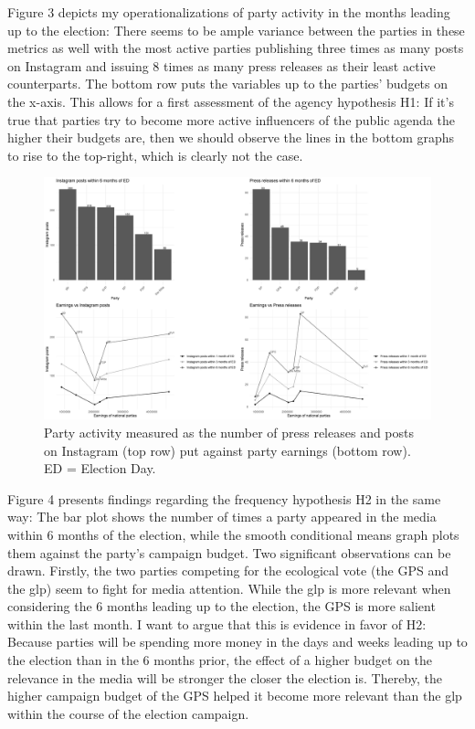 \documentclass[11pt,a4paper]{article}
\begin{document}
Figure 3 depicts my operationalizations of party activity in the months leading up to the election: There seems to be ample variance between the parties in these metrics as well with the most active parties publishing three times as many posts on Instagram and issuing 8 times as many press releases as their least active counterparts. The bottom row puts the variables up to the parties’ budgets on the x-axis. This allows for a first assessment of the agency hypothesis H1: If it’s true that parties try to become more active influencers of the public agenda the higher their budgets are, then we should observe the lines in the bottom graphs to rise to the top-right, which is clearly not the case.
\begin{figure}
    \centering
    \includegraphics[width=1\linewidth]{output/plots/plot_figure_3.png}
    \caption{Party activity measured as the number of press releases and posts on Instagram (top row) put against party earnings (bottom row). ED = Election Day.}
    \label{fig:enter-label}
\end{figure}
Figure 4 presents findings regarding the frequency hypothesis H2 in the same way: The bar plot shows the number of times a party appeared in the media within 6 months of the election, while the smooth conditional means graph plots them against the party’s campaign budget. Two significant observations can be drawn. Firstly, the two parties competing for the ecological vote (the GPS and the glp) seem to fight for media attention. While the glp is more relevant when considering the 6 months leading up to the election, the GPS is more salient within the last month. I want to argue that this is evidence in favor of H2: Because parties will be spending more money in the days and weeks leading up to the election than in the 6 months prior, the effect of a higher budget on the relevance in the media will be stronger the closer the election is. Thereby, the higher campaign budget of the GPS helped it become more relevant than the glp within the course of the election campaign. 
\end{document}
